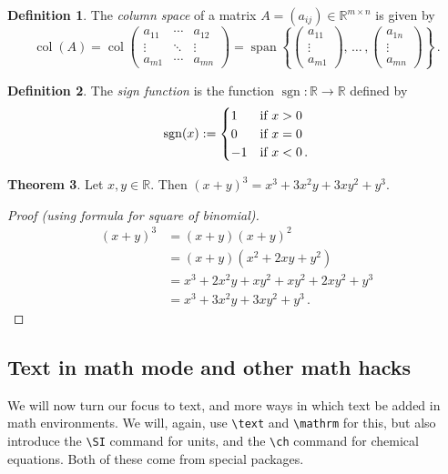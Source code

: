 \documentclass[11pt,letterpaper,titlepage]{article}
\numberwithin{equation}{section}
\numberwithin{figure}{section}
\numberwithin{table}{section}
\numberwithin{algorithm}{section}
\theoremstyle{definition}
\newtheorem{theorem}{Theorem}[section] %
\newtheorem{definition}[theorem]{Definition} %
\DeclareMathOperator{\col}{col}
\DeclareMathOperator{\spn}{span}
\newcommand{\RR}{\mathbb{R}}
\begin{document}
\begin{definition}
    The \emph{column space} of a matrix $A = (a_{ij})\in\RR^{m\times n}$ is given by
    \[\col(A)=
    \col\begin{pmatrix}
    a_{11} & \cdots & a_{12}\\
    \vdots & \ddots & \vdots\\
    a_{m1} & \cdots & a_{mn}
    \end{pmatrix}
    =\spn\left\{
        \begin{pmatrix}
            a_{11}\\\vdots\\a_{m1}
        \end{pmatrix}
        , \, \ldots \, ,
        \begin{pmatrix}
            a_{1n}\\\vdots\\a_{mn}
        \end{pmatrix}
    \right\}\,.\]
\end{definition}

\begin{definition}
    The \emph{sign function} is the function $\operatorname{sgn}\colon \RR\to\RR$ defined by
    \[\operatorname{sgn}(x):=
    \begin{cases}
        1   &\text{if $x>0$}\\
        0   &\text{if $x=0$}\\
        -1  &\text{if $x<0$\,.}
    \end{cases}\]
\end{definition}

\newpage
\begin{theorem}\label{thm:cubic}
    Let $x,y\in \RR$. Then $(x+y)^3=x^3+3x^2y+3xy^2+y^3$.
\end{theorem}

\begin{proof}[Proof (using formula for square of binomial)]
    \begin{align*}
    (x+y)^3 &=(x+y)(x+y)^2\\
            &=(x+y)(x^2+2xy+y^2)\\
            &=x^3+2x^2y+xy^2+xy^2+2xy^2+y^3\\
            &=x^3+3x^2y+3xy^2+y^3\,.\tag*{\qedhere}
    \end{align*}
\end{proof}

\subsection{Text in math mode and other math hacks}
We will now turn our focus to text, and more ways in which text  be added in math environments. We will, again, use \verb$\text$ and \verb$\mathrm$ for this, but also introduce the \verb$\SI$ command for units, and the \verb$\ch$ command for chemical equations. Both of these come from special packages.
\end{document}
